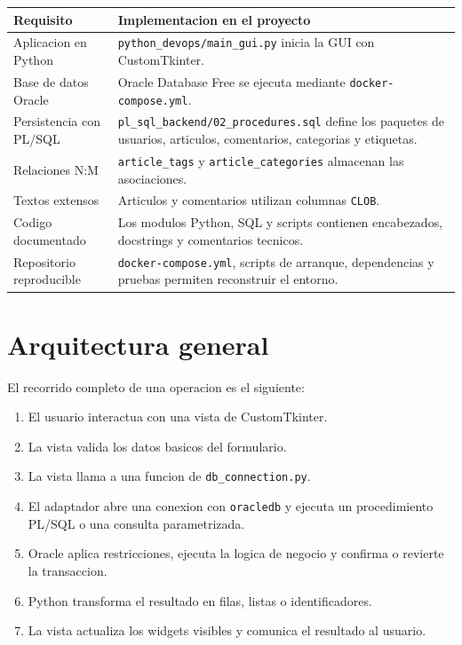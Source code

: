 \documentclass[12pt,a4paper]{article}
\begin{document}
\begin{longtable}{p{}p{}}
\toprule
\textbf{Requisito} & \textbf{Implementacion en el proyecto} \\
\midrule
Aplicacion en Python & \texttt{python\_devops/main\_gui.py} inicia la GUI con CustomTkinter. \\
Base de datos Oracle & Oracle Database Free se ejecuta mediante \texttt{docker-compose.yml}. \\
Persistencia con PL/SQL & \texttt{pl\_sql\_backend/02\_procedures.sql} define los paquetes de usuarios, articulos, comentarios, categorias y etiquetas. \\
Relaciones N:M & \texttt{article\_tags} y \texttt{article\_categories} almacenan las asociaciones. \\
Textos extensos & Articulos y comentarios utilizan columnas \texttt{CLOB}. \\
Codigo documentado & Los modulos Python, SQL y scripts contienen encabezados, docstrings y comentarios tecnicos. \\
Repositorio reproducible & \texttt{docker-compose.yml}, scripts de arranque, dependencias y pruebas permiten reconstruir el entorno. \\
\bottomrule
\end{longtable}

\section{Arquitectura general}

El recorrido completo de una operacion es el siguiente:

\begin{enumerate}
    \item El usuario interactua con una vista de CustomTkinter.
    \item La vista valida los datos basicos del formulario.
    \item La vista llama a una funcion de \texttt{db\_connection.py}.
    \item El adaptador abre una conexion con \texttt{oracledb} y ejecuta un
    procedimiento PL/SQL o una consulta parametrizada.
    \item Oracle aplica restricciones, ejecuta la logica de negocio y confirma
    o revierte la transaccion.
    \item Python transforma el resultado en filas, listas o identificadores.
    \item La vista actualiza los widgets visibles y comunica el resultado al
    usuario.
\end{enumerate}
\end{document}
